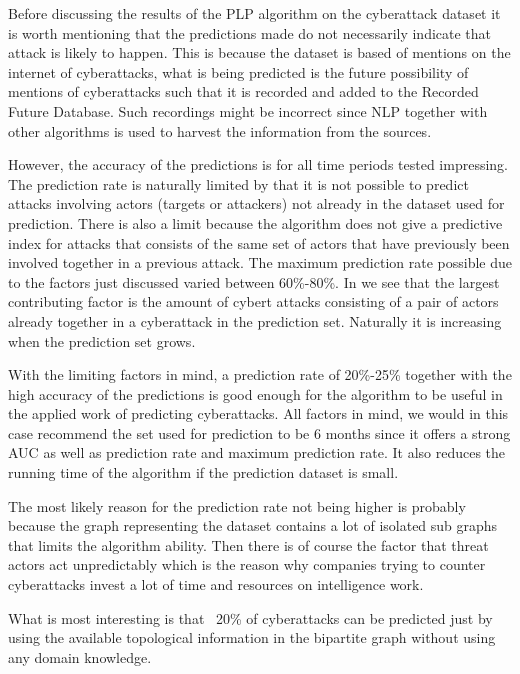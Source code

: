 
Before discussing the results of the PLP algorithm on the cyberattack dataset it is worth mentioning that the predictions made do not necessarily indicate that attack is likely to happen. This is because the dataset is based of mentions on the internet of cyberattacks, what is being predicted is the future possibility of mentions of cyberattacks such that it is recorded and added to the Recorded Future Database. Such recordings might be incorrect since NLP together with other algorithms is used to harvest the information from the sources.

However, the accuracy of the predictions is for all time periods tested impressing. The prediction rate is naturally limited by that it is not possible to predict attacks involving actors (targets or attackers) not already in the dataset used for prediction. There is also a limit because the algorithm does not give a predictive index for attacks that consists of the same set of actors that have previously been involved together in a previous attack. The maximum prediction rate possible due to the factors just discussed varied between 60\%-80\%. In  we see that the largest contributing factor is the amount of cybert attacks consisting of a pair of actors already together in a cyberattack in the prediction set. Naturally it is increasing when the prediction set grows.

With the limiting factors in mind, a prediction rate of 20\%-25\% together with the high accuracy of the predictions is good enough for the algorithm to be useful in the applied work of predicting cyberattacks. All factors in mind, we would in this case recommend the set used for prediction to be 6 months since it offers a strong AUC as well as prediction rate and maximum prediction rate. It also reduces the running time of the algorithm if the prediction dataset is small.

The most likely reason for the prediction rate not being higher is probably because the graph representing the dataset contains a lot of isolated sub graphs that limits the algorithm ability. Then there is of course the factor that threat actors act unpredictably which is the reason why companies trying to counter cyberattacks invest a lot of time and resources on intelligence work.

What is most interesting is that ~20\% of cyberattacks can be predicted just by using the available topological information in the bipartite graph without using any domain knowledge.

